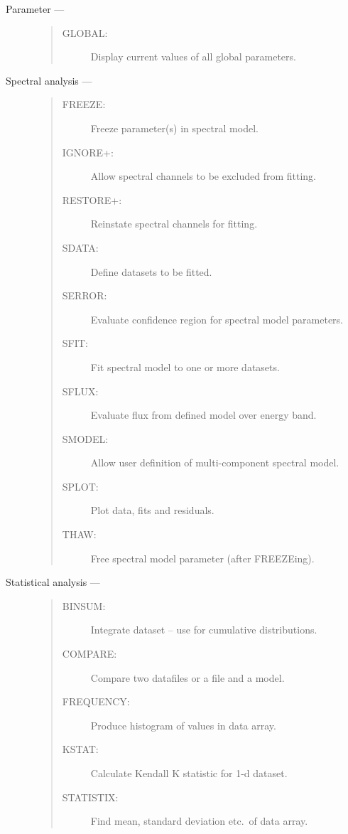 \begin{description}
\item [Parameter ---]
\begin{quote}
\begin{description}
\item [GLOBAL:]    Display current values of all global parameters.
\end{description}
\end{quote}

\item [Spectral analysis ---]
\begin{quote}
\begin{description}
\item [FREEZE:]    Freeze parameter(s) in spectral model.
\item [IGNORE+:]   Allow spectral channels to be excluded from fitting.
\item [RESTORE+:]  Reinstate spectral channels for fitting.
\item [SDATA:]     Define datasets to be fitted.
\item [SERROR:]    Evaluate confidence region for spectral model parameters.
\item [SFIT:]      Fit spectral model to one or more datasets.
\item [SFLUX:]     Evaluate flux from defined model over energy band.
\item [SMODEL:]    Allow user definition of multi-component spectral model.
\item [SPLOT:]     Plot data, fits and residuals.
\item [THAW:]      Free spectral model parameter (after FREEZEing).
\end{description}
\end{quote}

\item [Statistical analysis ---]
\begin{quote}
\begin{description}
\item [BINSUM:]    Integrate dataset -- use for cumulative distributions.
\item [COMPARE:]   Compare two datafiles or a file and a model.
\item [FREQUENCY:]  Produce histogram of values in data array.
\item [KSTAT:]     Calculate Kendall K statistic for 1-d dataset.
\item [STATISTIX:]  Find mean, standard deviation etc.\ of data array.
\end{description}
\end{quote}


\end{description}
